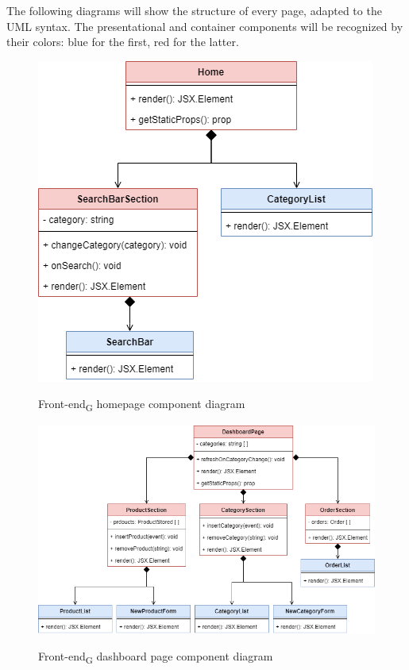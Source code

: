 The following diagrams will show the structure of every page, adapted to the UML syntax. The presentational and container components will be recognized by their colors: blue for the first, red for the latter. 

\begin{figure}[H]
\centering
\includegraphics[scale=0.50]{res/Architettura/Frontend/img/home}\\
\caption{Front-end\textsubscript{G} homepage component diagram}
\end{figure}

\begin{figure}[H]
\centering
\includegraphics[scale=0.50]{res/Architettura/Frontend/img/dashboard}\\
\caption{Front-end\textsubscript{G} dashboard page component diagram}
\end{figure}

